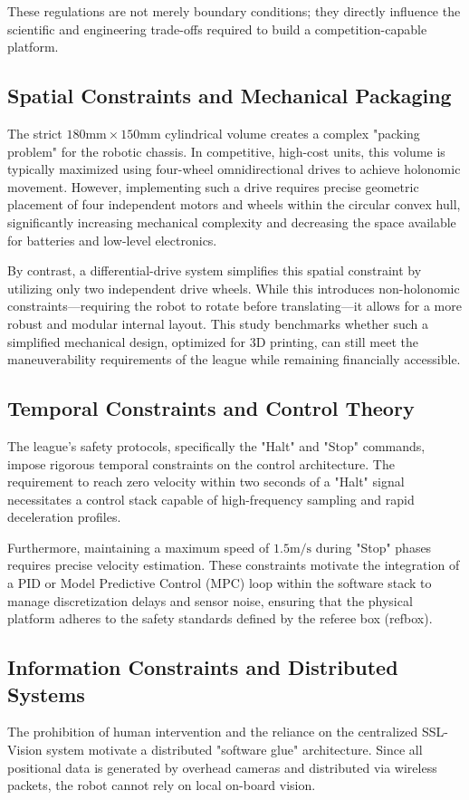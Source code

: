 \documentclass[a4paper,twoside,12pt]{report}
\begin{document}
These regulations are not merely boundary conditions; they directly influence the scientific and engineering trade-offs required to build a competition-capable platform.

\subsection{Spatial Constraints and Mechanical Packaging}
The strict $180\text{mm} \times 150\text{mm}$ cylindrical volume creates a complex "packing problem" for the robotic chassis. 
In competitive, high-cost units, this volume is typically maximized using four-wheel omnidirectional drives to achieve holonomic movement. 
However, implementing such a drive requires precise geometric placement of four independent motors and wheels within the circular convex hull,
 significantly increasing mechanical complexity and decreasing the space available for batteries and low-level electronics. \citep{ateam2023tdp}

By contrast, a differential-drive system simplifies this spatial constraint by utilizing only two independent drive wheels. 
While this introduces non-holonomic constraints---requiring the robot to rotate before translating---it allows for a more robust and modular internal layout. 
This study benchmarks whether such a simplified mechanical design, optimized for 3D printing, can still meet the maneuverability requirements of the league while remaining financially accessible.

\subsection{Temporal Constraints and Control Theory}
The league's safety protocols, specifically the "Halt" and "Stop" commands, impose rigorous temporal constraints on the control architecture. 
The requirement to reach zero velocity within two seconds of a "Halt" signal necessitates a control stack capable of high-frequency sampling and rapid deceleration profiles. 

Furthermore, maintaining a maximum speed of $1.5\text{m/s}$ during "Stop" phases requires precise velocity estimation. 
These constraints motivate the integration of a PID or Model Predictive Control (MPC) loop within the software stack to manage discretization delays and sensor noise,
 ensuring that the physical platform adheres to the safety standards defined by the referee box (refbox). \citep{pacheco2015testing}

\subsection{Information Constraints and Distributed Systems}
The prohibition of human intervention and the reliance on the centralized SSL-Vision system motivate a distributed "software glue" architecture. 
Since all positional data is generated by overhead cameras and distributed via wireless packets, the robot cannot rely on local on-board vision. 
\end{document}
